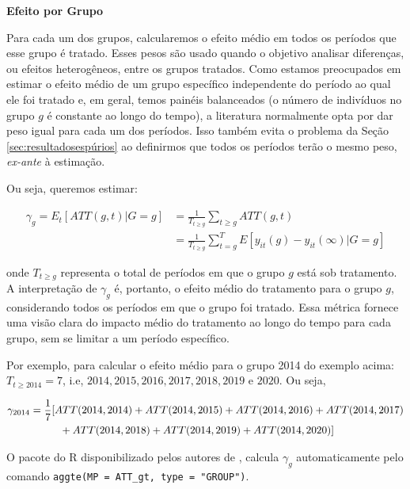 \documentclass[portugues]{article}
\begin{document}
\vspace{3mm}

\textbf{Efeito por Grupo}

\vspace{2mm}

Para cada um dos grupos, calcularemos o efeito médio em todos os períodos que esse grupo é tratado. Esses pesos são usado quando o objetivo analisar diferenças, ou efeitos heterogêneos, entre os grupos tratados. Como estamos preocupados em estimar o efeito médio de um grupo específico independente do período ao qual ele foi tratado e, em geral, temos painéis balanceados (o número de indivíduos no grupo $g$ é constante ao longo do tempo), a literatura normalmente opta por dar peso igual para cada um dos períodos. Isso também evita o problema da Seção \ref{sec:resultadosespúrios} ao definirmos que todos os períodos terão o mesmo peso,\textit{ ex-ante} à estimação.

Ou seja, queremos estimar:

\[
\begin{split}
  \gamma_g = E_{t}[ATT(g,t) | G=g] &= \frac{1}{T_{t \geq g}} \sum_{t \geq g} ATT(g,t) \\ 
  &= \frac{1}{T_{t \geq g}} \sum_{t=g}^{T}  E[y_{it}(g) - y_{it}(\infty)|G=g]
\end{split}
\]

\noindent onde $T_{t \geq g}$ representa o total de períodos em que o grupo $g$ está sob tratamento. A interpretação de $\gamma_g$ é, portanto, o efeito médio do tratamento para o grupo $g$, considerando todos os períodos em que o grupo foi tratado. Essa métrica fornece uma visão clara do impacto médio do tratamento ao longo do tempo para cada grupo, sem se limitar a um período específico.

Por exemplo, para calcular o efeito médio para o grupo 2014 do exemplo acima: $T_{t \geq 2014} = 7$, i.e, $2014, 2015, 2016, 2017, 2018, 2019$ e $2020$. Ou seja,

\[
\begin{split}
    \gamma_{2014} &= \frac{1}{7} [ATT(2014, 2014) + ATT(2014,2015) + ATT(2014, 2016) + ATT(2014,2017) \\
    & \hspace{10mm} + ATT(2014,2018) + ATT(2014,2019) + ATT(2014,2020)]
\end{split}
\]

O pacote do R disponibilizado pelos autores de \cite{callaway2021difference}, calcula $\gamma_g$ automaticamente pelo comando \texttt{aggte(MP = ATT\_gt, type = "GROUP")}.
\end{document}
